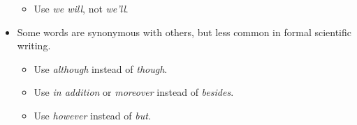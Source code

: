 \begin{itemize}
\begin{itemize}
        \item Use \emph{we will}, not \emph{we'll}.
    \end{itemize} 
    \item Some words are synonymous with others, but less common in formal scientific writing.
    \begin{itemize}
        \item Use \emph{although} instead of \emph{though}.
        \item Use \emph{in addition} or \emph{moreover} instead of \emph{besides}.
        \item Use \emph{however} instead of \emph{but}.
    \end{itemize}
\end{itemize}